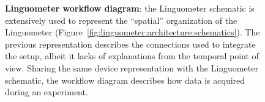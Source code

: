 \begin{figure}%
\centering
{}
	\caption[Linguometer workflow diagram]{\textbf{Linguometer workflow
	diagram}: 
	the Linguometer schematic is extensively used to represent the ``spatial'' 
	organization of the Linguometer 
	(Figure~\ref{fig:linguometer:architecture:schematics}).
	The previous representation describes the
	connections used to integrate the setup, albeit it lacks of explanations
	from the temporal point of view.
	Sharing the same device representation with the Linguometer schematic,
	the workflow diagram describes how data is acquired during an experiment.}
	\label{fig:linguometer:architecture:workflow}
\end{figure}
